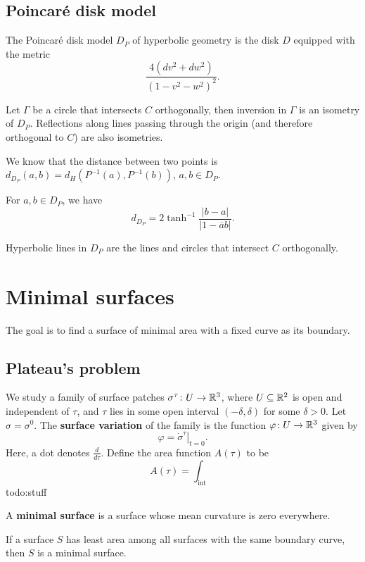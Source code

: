 \subsection{Poincar\'e disk model}
\begin{definition}[]
    The Poincar\'e disk model $D_P$ of hyperbolic geometry is the disk $D$ equipped with the metric \[
        \frac{4(dv ^2+ dw^2)}{(1-v^2-w^2)^2}.
    \] 
\end{definition}
\begin{prop}
    Let $\Gamma$ be a circle that intersects $C$ orthogonally, then inversion in $\Gamma$ is an isometry of $D_P$. Reflections along lines passing through the origin (and therefore orthogonal to $C$) are also isometries.
\end{prop}
We know that the distance between two points is $d_{D_P}(a,b)=d_H(P^{-1}(a),P^{-1}(b))$, $a,b \in D_P$. 
\begin{prop}
    For $a,b\in D_P$, we have \[
    d_{D_P}=2 \tanh ^{-1} \frac{|b-a|}{|1-\overline{a}b|}.
    \] 
\end{prop}
\begin{prop}
    Hyperbolic lines in $D_P$ are the lines and circles that intersect $C$ orthogonally.
\end{prop}

\section{Minimal surfaces} 
The goal is to find a surface of minimal area with a fixed curve as its boundary. 

\subsection{Plateau's problem}
We study a family of surface patches $\sigma^{\tau}\colon U \to \mathbb{R}^3$, where $U \subseteq \mathbb{R}^2$ is open and independent of $\tau$, and $\tau$ lies in some open interval $(-\delta , \delta )$ for some $\delta >0$. Let $\sigma=\sigma^0$. The \textbf{surface variation} of the family is the function $\varphi  \colon U \to \mathbb{R}^3$ given by \[
\varphi =\left. \dot \sigma^{\tau}
\right|_{t=0}. \] Here, a dot denotes $\frac{d}{d\tau}$. Define the area function $A(\tau)$ to be \[
A(\tau)= \int _{\text{int} \ }
\] {\color{red}todo:stuff} 
\begin{definition}[]
    A \textbf{minimal surface} is a surface whose mean curvature is zero everywhere.
\end{definition}
\begin{cor}
    If a surface $S$ has least area among all surfaces with the same boundary curve, then $S$ is a minimal surface.
\end{cor}

